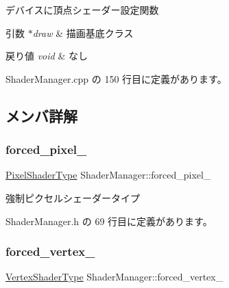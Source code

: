 デバイスに頂点シェーダー設定関数 


\begin{DoxyParams}{引数}
{\em $\ast$draw} & 描画基底クラス \\
\hline
\end{DoxyParams}

\begin{DoxyRetVals}{戻り値}
{\em void} & なし \\
\hline
\end{DoxyRetVals}


 Shader\+Manager.\+cpp の 150 行目に定義があります。



\subsection{メンバ詳解}
\mbox{\label{class_shader_manager_a36e2deec42b20cc8a5d06987a0a74dc6}} 
\subsubsection{\texorpdfstring{forced\+\_\+pixel\+\_\+}{forced\_pixel\_}}
{\footnotesize\ttfamily \mbox{\hyperlink{class_shader_manager_a7d15d773b3c6a99dd7086c45c8b0be5f}{Pixel\+Shader\+Type}} Shader\+Manager\+::forced\+\_\+pixel\+\_\+\hspace{0.3cm}{\ttfamily [private]}}



強制ピクセルシェーダータイプ 



 Shader\+Manager.\+h の 69 行目に定義があります。

\mbox{\label{class_shader_manager_ab19a3d8d5ae1099c655d04e5e1218575}} 
\subsubsection{\texorpdfstring{forced\+\_\+vertex\+\_\+}{forced\_vertex\_}}
{\footnotesize\ttfamily \mbox{\hyperlink{class_shader_manager_a9b51e49d70eb3cc58f6d1f3994e8cfbd}{Vertex\+Shader\+Type}} Shader\+Manager\+::forced\+\_\+vertex\+\_\+\hspace{0.3cm}{\ttfamily [private]}}



